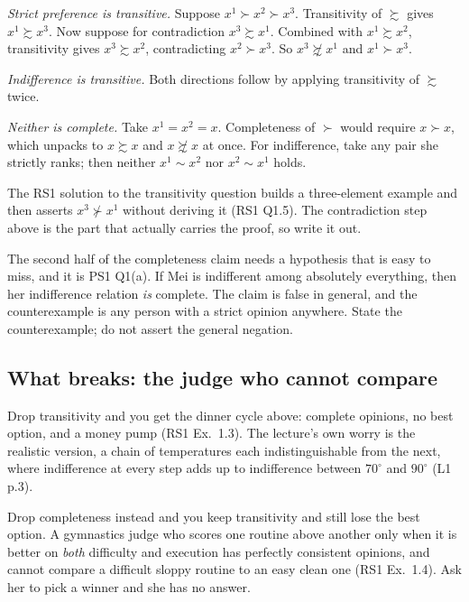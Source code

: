 \documentclass[11pt,letterpaper]{article}
\theoremstyle{definition}
\theoremstyle{plain}
\newcommand{\src}[1]{{\small\textsf{(#1)}}}
\newcommand{\wpref}{\succsim}
\newcommand{\spref}{\succ}
\newcommand{\indif}{\sim}
\newcommand{\skipnote}{\noindent{\small\textsf{Proof. Skippable on a first read.}}\par\smallskip}
\begin{document}
\skipnote
\begin{leftbar}
\small
\emph{Strict preference is transitive.} Suppose $x^1 \spref x^2 \spref x^3$. Transitivity of
$\wpref$ gives $x^1 \wpref x^3$. Now suppose for contradiction $x^3 \wpref x^1$. Combined with
$x^1 \wpref x^2$, transitivity gives $x^3 \wpref x^2$, contradicting $x^2 \spref x^3$. So
$x^3 \not\wpref x^1$ and $x^1 \spref x^3$.

\emph{Indifference is transitive.} Both directions follow by applying transitivity of $\wpref$
twice.

\emph{Neither is complete.} Take $x^1 = x^2 = x$. Completeness of $\spref$ would require
$x \spref x$, which unpacks to $x \wpref x$ and $x \not\wpref x$ at once. For indifference, take any
pair she strictly ranks; then neither $x^1 \indif x^2$ nor $x^2 \indif x^1$ holds.
\end{leftbar}

\begin{snugshade}
\noindent The RS1 solution to the transitivity question builds a three-element example and then
asserts $x^3 \not\spref x^1$ without deriving it \src{RS1 Q1.5}. The contradiction step above is the
part that actually carries the proof, so write it out.

\noindent The second half of the completeness claim needs a hypothesis that is easy to miss, and it
is PS1 Q1(a). If Mei is indifferent among absolutely everything, then her indifference relation
\emph{is} complete. The claim is false in general, and the counterexample is any person with a
strict opinion anywhere. State the counterexample; do not assert the general negation.
\end{snugshade}

\subsection{What breaks: the judge who cannot compare}

Drop transitivity and you get the dinner cycle above: complete opinions, no best option, and a money
pump \src{RS1 Ex.\ 1.3}. The lecture's own worry is the realistic version, a chain of temperatures
each indistinguishable from the next, where indifference at every step adds up to indifference
between $70^\circ$ and $90^\circ$ \src{L1 p.3}.

Drop completeness instead and you keep transitivity and still lose the best option. A gymnastics
judge who scores one routine above another only when it is better on \emph{both} difficulty and
execution has perfectly consistent opinions, and cannot compare a difficult sloppy routine to an
easy clean one \src{RS1 Ex.\ 1.4}. Ask her to pick a winner and she has no answer.
\end{document}
